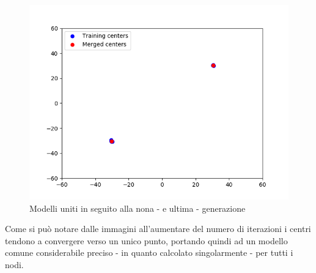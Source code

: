\begin{figure}[!htb]
  \centering
  \includegraphics[scale=0.6]{../Immagini/merge11.png}
  \caption{Modelli uniti in seguito alla nona - e ultima - generazione}
  \label{fig:merge11}
\end{figure}


Come si può notare dalle immagini all'aumentare del numero di iterazioni i centri tendono a convergere verso un unico punto, portando quindi ad un modello comune considerabile preciso - in quanto calcolato singolarmente - per tutti i nodi.
\newpage
